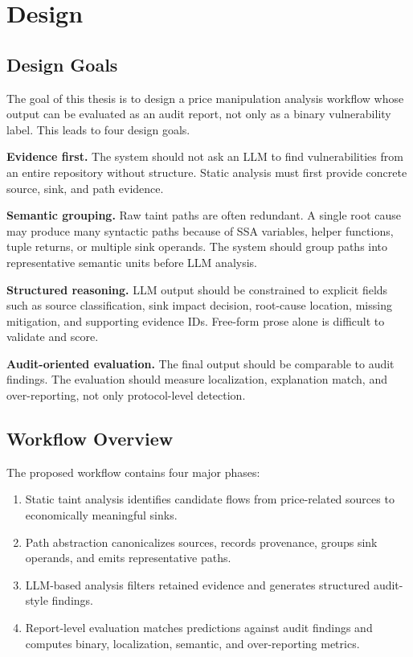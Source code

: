 
\chapter{Design}

\section{Design Goals}

The goal of this thesis is to design a price manipulation analysis workflow
whose output can be evaluated as an audit report, not only as a binary
vulnerability label. This leads to four design goals.

\textbf{Evidence first.} The system should not ask an LLM to find
vulnerabilities from an entire repository without structure. Static analysis
must first provide concrete source, sink, and path evidence.

\textbf{Semantic grouping.} Raw taint paths are often redundant. A single root
cause may produce many syntactic paths because of SSA variables, helper
functions, tuple returns, or multiple sink operands. The system should group
paths into representative semantic units before LLM analysis.

\textbf{Structured reasoning.} LLM output should be constrained to explicit
fields such as source classification, sink impact decision, root-cause
location, missing mitigation, and supporting evidence IDs. Free-form prose
alone is difficult to validate and score.

\textbf{Audit-oriented evaluation.} The final output should be comparable to
audit findings. The evaluation should measure localization, explanation match,
and over-reporting, not only protocol-level detection.

\section{Workflow Overview}

The proposed workflow contains four major phases:

\begin{enumerate}
  \item Static taint analysis identifies candidate flows from price-related
        sources to economically meaningful sinks.
  \item Path abstraction canonicalizes sources, records provenance, groups
        sink operands, and emits representative paths.
  \item LLM-based analysis filters retained evidence and generates structured
        audit-style findings.
  \item Report-level evaluation matches predictions against audit findings and
        computes binary, localization, semantic, and over-reporting metrics.
\end{enumerate}

